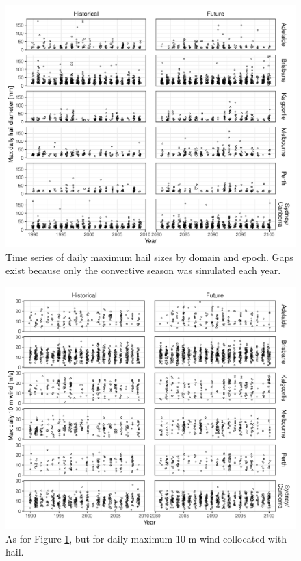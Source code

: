 \documentclass[]{agujournal2019}\usepackage[]{graphicx}\usepackage[]{xcolor}
\begin{document}
\begin{figure}[!ht]
      \includegraphics[width=\textwidth]{figures/timeseries_hail}
      \caption{Time series of daily maximum hail sizes by domain and epoch. Gaps exist because only the convective season was simulated each year.}
      \label{fig:timeseries_hail}
\end{figure}

\begin{figure}[!ht]
      \includegraphics[width=\textwidth]{figures/timeseries_wind}
      \caption{As for Figure \ref{fig:timeseries_hail}, but for daily maximum 10 m wind collocated with hail.}
      \label{fig:timeseries_wind}
\end{figure}
\end{document}
